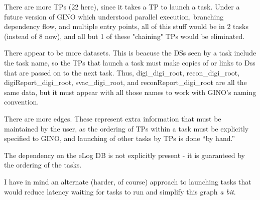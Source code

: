 \documentclass{article}
\begin{document}
There are more TPs (22 here), since it takes a TP to launch a task.  Under a
future version of GINO which understood parallel execution, branching
dependency flow, and multiple entry points, all of this stuff would be in 2
tasks (instead of 8 now), and all but 1 of these "chaining" TPs would be
eliminated.

There appear to be more datasets.  This is beacuse the DSs seen by a task
include the task name, so the TPs that launch a task must make copies of or
links to Dss that are passed on to the next task.  Thus, digi\_digi\_root,
recon\_digi\_root, digiReport\_digi\_root, svac\_digi\_root, and
reconReport\_digi\_root are all the same data, but it must appear with all those
names to work with GINO's naming convention.

There are more edges.  These represent extra information that must be
maintained by the user, as the ordering of TPs within a task must be
explicitly specified to GINO, and launching of other tasks by TPs is done ``by hand.''

The dependency on the eLog DB is not explicitly present - it is guaranteed by
the ordering of the tasks.

I have in mind an alternate (harder, of course) approach to launching tasks
that would reduce latency waiting for tasks to run and simplify this graph
\emph{a bit}.
\end{document}
